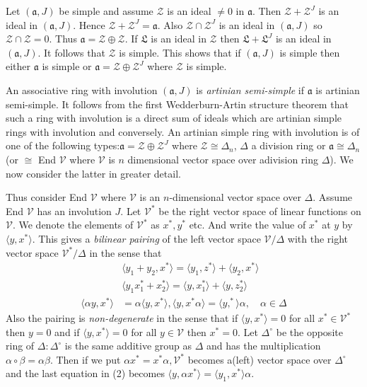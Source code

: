 \begin{enumerate}[I.]
Let $(\mathfrak{a}, J)$ be simple and assume $\mathscr{Z}$ is an ideal $\neq 0$ in $\mathfrak{a}$. Then $\mathscr{Z}+\mathscr{Z}^{J}$ is an ideal in $(\mathfrak{a}, J)$. Hence $\mathscr{Z}+\mathscr{Z}^{J}=\mathfrak{a}$. Also $\mathscr{Z}\cap \mathscr{Z}^{J}$ is an ideal in $(\mathfrak{a}, J)$ so $\mathscr{Z}\cap\mathscr{Z}=0$. Thus $\mathfrak{a}=\mathscr{Z}\oplus\mathscr{Z}$. If $\mathfrak{L}$ is an ideal in $\mathscr{Z}$ then $\mathfrak{L}+\mathfrak{L}^{J}$ is an ideal in $(\mathfrak{a}, J)$. It follows that $\mathscr{Z}$ is simple. This shows that if $(\mathfrak{a}, J)$ is simple then either $\mathfrak{a}$ is simple or $\mathfrak{a}=\mathscr{Z}\oplus\mathscr{Z}^{J}$ where $\mathscr{Z}$ is simple.

An associative ring with involution $(\mathfrak{a}, J)$ is {\em artinian semi-simple} if $\mathfrak{a}$ is artinian semi-simple. It follows from the first Wedderburn-Artin structure theorem that such a ring with involution is a direct sum of ideals which are artinian simple rings with involution and conversely. An artinian simple ring with involution is of one of the following types:$\mathfrak{a}=\mathscr{Z}\oplus\mathscr{Z}^{J}$ where $\mathscr{Z}\cong \Delta_n$, $\Delta$ a division ring or $\mathfrak{a}\cong \Delta_n$ (or $\cong$ End $\mathcal{V}$ where $\mathcal{V}$ is $n$ dimensional vector space over a\pageoriginale division ring $\Delta$). We now consider the latter in greater detail.

Thus consider End $\mathcal{V}$ where $\mathcal{V}$ is an $n$-dimensional vector space over $\Delta$. Assume End $\mathcal{V}$ has an involution $J$. Let $\mathcal{V}^{\ast}$ be the right vector space of linear functions on $\mathcal{V}$. We denote the elements of $\mathcal{V}^{\ast}$ as $x^{\ast}, y^{\ast}$ etc. And write the value of $x^{\ast}$ at $y$ by $\langle y, x^{\ast}\rangle$. This gives a {\em bilinear pairing} of the left vector space $\mathcal{V}/\Delta$ with the right vector space $\mathcal{V}^{\ast}/\Delta$ in the sense that 
\begin{align*}
   &\langle y_1+y_2, x^{\ast}\rangle = \langle y_1,
   z^{\ast}\rangle+\langle y_2, x^{\ast}\rangle\\ 
   &\langle y_1 x_{1}^{\ast}+x_{2}^{\ast}\rangle=\langle y,
   x_{1}^{\ast}\rangle+\langle y, z_{2}^{\ast}\rangle\tag{2}\label{c0:eq2}\\ 
\langle \alpha y,x^{\ast}\rangle&=\alpha \langle y,x^{\ast}\rangle, \langle y,x^{\ast} \alpha\rangle=\langle y, ^{\ast}\rangle\alpha,\quad \alpha \in \Delta
\end{align*}
Also the pairing is {\em non-degenerate} in the sense that if $\langle y, x^{\ast}\rangle=0$ for all $x^{\ast}\in \mathcal{V}^{\ast}$ then $y=0$ and if $\langle y,x^{\ast}\rangle=0$ for all $y\in \mathcal{V}$ then $x^{\ast}=0$. Let $\Delta^{\circ}$ be the opposite ring of $\Delta:\Delta^{\circ}$ is the same additive group as $\Delta$ and has the multiplication $\alpha \circ \beta=\alpha \beta$. Then if we put $\alpha x^{\ast}=x^{\ast}\alpha, \mathcal{V}^{\ast}$ becomes a(left) vector space over $\Delta^{\circ}$ and the last equation in (2) becomes $\langle y, \alpha x^{\ast}\rangle=\langle y_1,x^{\ast}\rangle\alpha$.


\end{enumerate}
